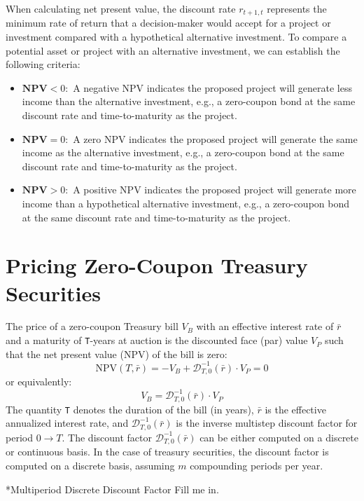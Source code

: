 \documentclass[11pt]{article}
\makeatletter
\theoremstyle{definition}
\renewcommand\subsection{\@startsection
	{subsection}{2}{0mm}
	{-0.05in}
	{-0.5\baselineskip}
	{\normalfont\normalsize\bfseries}}
\makeatother
\begin{document}
When calculating net present value, the discount rate $r_{t+1,t}$ represents the minimum rate of return that a decision-maker would accept 
for a project or investment compared with a hypothetical alternative investment. 
To compare a potential asset or project with an alternative investment, we can establish the following criteria:
\begin{itemize}
\item{$\textbf{NPV}<0$:~}{A negative NPV indicates the proposed project will generate less income than the alternative investment, e.g., a zero-coupon bond at the same discount rate and time-to-maturity as the project.}
\item{$\textbf{NPV}=0$:~}{A zero NPV indicates the proposed project will generate the same income as the alternative investment, e.g., a zero-coupon bond at the same discount rate and time-to-maturity as the project. }
\item{$\textbf{NPV}>0$:~}{A positive NPV indicates the proposed project will generate more income than a hypothetical alternative investment, e.g., a zero-coupon bond at the same discount rate and time-to-maturity as the project.}
\end{itemize}

\section*{Pricing Zero-Coupon Treasury Securities}\label{sec:zero-coupon-treasury-securities}
The price of a zero-coupon Treasury bill $V_{B}$ with an effective interest rate of $\bar{r}$ and a maturity of \texttt{T}-years at auction 
is the discounted face (par) value $V_{P}$ such that the net present value (NPV) of the bill is zero:
\begin{equation}    
\text{NPV}(T,\bar{r}) = -V_{B} + \mathcal{D}_{T,0}^{-1}(\bar{r})\cdot{V_{P}} = 0
\end{equation}
or equivalently:
\begin{equation}
    V_{B} = \mathcal{D}_{T,0}^{-1}(\bar{r})\cdot{V_{P}}
\end{equation}
The quantity \texttt{T} denotes the duration of the bill (in years), 
$\bar{r}$ is the effective annualized interest rate,  and $\mathcal{D}_{T,0}^{-1}(\bar{r})$ is the inverse multistep discount factor
for period $0\rightarrow{T}$. 
The discount factor $\mathcal{D}_{T,0}^{-1}(\bar{r})$ can be either computed on a discrete or continuous basis. 
In the case of treasury securities, the discount factor is computed on a discrete basis, assuming $m$ compounding periods per year.

\subsection*{Multiperiod Discrete Discount Factor}
Fill me in.


\clearpage
\printindex
\end{document}

